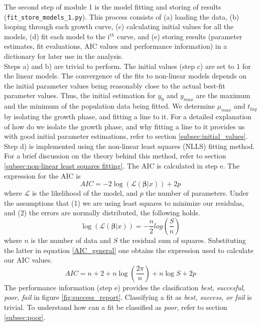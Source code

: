 \documentclass[titlepage,11pt]{article}
\begin{document}
\begin{linenumbers}
	The second step of module 1 is the model fitting and storing of results (\verb|fit_store_models_1.py|). This process consists of (a) loading the data, (b) looping through each growth curve, (c) calculating initial values for all the models, (d) fit each model to the i$ ^{th} $ curve, and (e) storing results (parameter estimates, fit evaluations, AIC values and performance information) in a dictionary for later use in the analysis. \\
	Steps a) and b) are trivial to perform. The initial values (step c) are set to 1 for the linear models. The convergence of the fits to non-linear models depends on the initial parameter values being reasonably close to the actual best-fit parameter values. Thus, the initial estimation for $ y_{0} $ and $ y_{max} $ are the maximum and the minimum of the population data being fitted. We determine $ \mu_{max} $ and $ t_{lag} $ by isolating the growth phase, and fitting a line to it. For a detailed explanation of how do we isolate the growth phase, and why fitting a line to it provides us with good initial parameter estimations, refer to section \ref{subsec:initial_values}. Step d) is implemented using the non-linear least squares (NLLS) fitting method. For a brief discussion on the theory behind this method, refer to section \ref{subsec:non-linear least squares fitting}. The AIC is calculated in step e. The expression for the AIC is
	\begin{equation}
		AIC = -2\log\left(\mathcal{L}(\boldsymbol{\beta}|x)\right) + 2p
		\label{AIC_general}
	\end{equation}
 	where $ \mathcal{L} $ is the likelihood of the model, and $ p $ the number of parameters. Under the assumptions that (1) we are using least squares to minimize our residulas, and (2) the errors are normally distributed, the following holds.
 	\begin{equation}
 		\log\left(\mathcal{L}(\boldsymbol{\beta}|x)\right) = -\frac{n}{2}log\left(\frac{S}{n}\right) 
 	\end{equation}
 	where $ n $ is the number of data and $ S $ the residual sum of squares. Substituting the latter in equation \ref{AIC_general} one obtains the expression used to calculate our AIC values. \\
 	\begin{equation}
 	AIC = n + 2 + n \log\left(\frac{2\pi}{n}\right) + n\log S + 2 p
 	\end{equation}
 	The performance information (step e) provides the clasification \textit{best, succesful, poor, fail} in figure \ref{fig:success_report}.  Classifying a fit as \textit{best, success, or fail} is trivial. To understand how can a fit be classified as \textit{poor}, refer to section \ref{subsec:poor}.\\
 	

\end{linenumbers}
\end{document}
